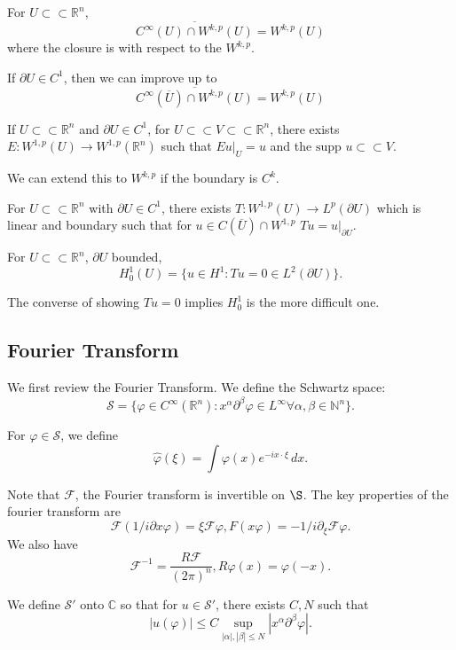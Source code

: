 \documentclass[12pt]{scrartcl}
\newcommand{\N}{\mathbb{N}}
\newcommand{\R}{\mathbb{R}}
\newcommand{\C}{\mathbb C}
\renewcommand{\hat}{\widehat}
\newcommand{\<}{\langle}
\renewcommand{\>}{\rangle}
\let \phi \varphi
\let \mc \mathcal
\newcommand{\supp}{\text{supp }}
\begin{document}
\begin{thm}[Approximation] For $U \subset \subset \R^n$, 
$$\overline{C^\infty(U) \cap W^{k, p}(U)} = W^{k, p}(U)$$
where the closure is with respect to the $W^{k, p}$.

If $\partial U \in C^1$, then we can improve up to 
$$\overline{C^\infty(\overline{U}) \cap W^{k, p}(U)} = W^{k, p}(U)$$
\end{thm}

\begin{thm}[Extension] If $U \subset \subset \R^n$
 and $\partial U \in C^1$, for $U \subset \subset V \subset \subset \R^n$, there exists $E: W^{1, p}(U) \to W^{1, p}(\R^n)$ such that $Eu\vert_{U} = u$ and the $\supp u \subset \subset V$.
 
We can extend this to $W^{k, p}$ if the boundary is $C^k$.
\end{thm}

\begin{thm}[Traces] For $U \subset \subset \R^n$ with $\partial U \in C^1$, there exists $T: W^{1, p}(U) \to L^p(\partial U)$ which is linear and boundary such that for $u \in C(\overline{U}) \cap W^{1, p}$ $Tu = u\vert_{\partial U}$.
\end{thm}

\begin{example} For $U \subset \subset \R^n$, $\partial U$ bounded, $$H_0^1(U) = \{u \in H^1 : Tu = 0 \in L^2(\partial U)\}.$$

The converse of showing $Tu = 0$ implies $H_0^1$ is the more difficult one.  
\end{example}

\subsection{Fourier Transform}
We first review the Fourier Transform.  We define the Schwartz space: $$\mc S = \{\phi \in C^\infty(\R^n) : x^\alpha \partial^\beta \phi \in L^\infty \forall \alpha, \beta \in \N^n\}.$$

For $\phi \in \mc S$, we define 
$$\hat{\phi} (\xi) = \int \phi(x) e^{-ix \cdot \xi}\, dx.$$

Note that $\mc F$, the Fourier transform is invertible on $\S$.  The key properties of the fourier transform are
$$\mc F (1/i \partial x \phi) = \xi \mc F \phi, F(x \phi) = -1/i \partial_{\xi} \mc F \phi.$$
We also have 
$$\mc F^{-1} = \frac{R\mc F}{(2\pi)^n}, R\phi(x) = \phi(-x).$$

We define $\mc S'$ onto $\C$ so that for $u \in \mc S'$, there exists $C, N$ such that 
$$|u(\phi)| \le C \sup_{|\alpha|, |\beta| \le N} |x^\alpha \partial^\beta \phi|.$$
\end{document}
